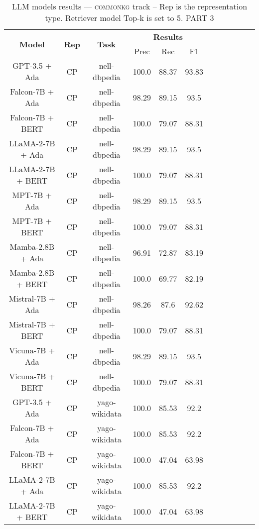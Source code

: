 \begin{table}
        \centering
        \small
        \caption{LLM models results --- \textsc{commonkg} track -- Rep is the representation type. Retriever model Top-k is set to 5. PART 3 } \label{tab:llm_commonkg3}
        \begin{tabular}{|c|c|c|c|c|c|c|c|c|c|c|c|}
            \hline
             \multirow{2}{*}{\textbf{Model}}  & \multirow{2}{*}{\textbf{Rep}}  & \multirow{2}{*}{\textbf{Task}} &  \multicolumn{3}{c|}{\textbf{Results}} \\
             \cline{4-6}
              & & & Prec & Rec & F1  \\
            \hline
	GPT-3.5 + Ada  & CP & nell-dbpedia  &  100.0 &  88.37 & 93.83  \\
	Falcon-7B + Ada  & CP & nell-dbpedia  &  98.29 &  89.15 & 93.5  \\
	Falcon-7B + BERT  & CP & nell-dbpedia  &  100.0 &  79.07 & 88.31  \\
	LLaMA-2-7B + Ada  & CP & nell-dbpedia  &  98.29 &  89.15 & 93.5  \\
	LLaMA-2-7B + BERT  & CP & nell-dbpedia  &  100.0 &  79.07 & 88.31  \\
	MPT-7B + Ada  & CP & nell-dbpedia  &  98.29 &  89.15 & 93.5  \\
	MPT-7B + BERT  & CP & nell-dbpedia  &  100.0 &  79.07 & 88.31  \\
	Mamba-2.8B + Ada  & CP & nell-dbpedia  &  96.91 &  72.87 & 83.19  \\
	Mamba-2.8B + BERT  & CP & nell-dbpedia  &  100.0 &  69.77 & 82.19  \\
	Mistral-7B + Ada  & CP & nell-dbpedia  &  98.26 &  87.6 & 92.62  \\
	Mistral-7B + BERT  & CP & nell-dbpedia  &  100.0 &  79.07 & 88.31  \\
	Vicuna-7B + Ada  & CP & nell-dbpedia  &  98.29 &  89.15 & 93.5  \\
	Vicuna-7B + BERT  & CP & nell-dbpedia  &  100.0 &  79.07 & 88.31  \\
	\hline
	GPT-3.5 + Ada  & CP & yago-wikidata  &  100.0 &  85.53 & 92.2  \\
	Falcon-7B + Ada  & CP & yago-wikidata  &  100.0 &  85.53 & 92.2  \\
	Falcon-7B + BERT  & CP & yago-wikidata  &  100.0 &  47.04 & 63.98  \\
	LLaMA-2-7B + Ada  & CP & yago-wikidata  &  100.0 &  85.53 & 92.2  \\
	LLaMA-2-7B + BERT  & CP & yago-wikidata  &  100.0 &  47.04 & 63.98  \\

\end{tabular}
\end{table}
